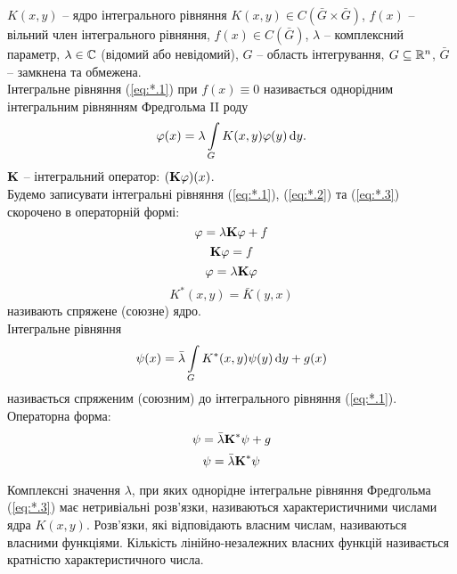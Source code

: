 $K(x, y)$ -- ядро інтегрального рівняння $K(x, y) \in C(\bar G \times \bar G)$, $f(x)$ -- вільний член інтегрального рівняння, $f(x) \in C(\bar G)$, $\lambda$ -- комплексний параметр, $\lambda \in \CC$ (відомий або невідомий), $G$ -- область інтегрування, $G \subseteq \RR^n$, $\bar G$ -- замкнена та обмежена. \\

Інтегральне рівняння (\ref{eq:*.1}) при $f(x) \equiv 0$ називається однорідним інтегральним рівнянням Фредгольма II роду
\begin{equation}
	\label{eq:*.3}
	\phi(x) = \lambda \Int_G K(x, y) \phi(y) \diff y.
\end{equation}
$\bf{K}$ -- інтегральний оператор: $(\bf{K} \phi)(x)$. \\

Будемо записувати інтегральні рівняння (\ref{eq:*.1}), (\ref{eq:*.2}) та (\ref{eq:*.3}) скорочено в операторній формі:
\begin{equation}
	\label{eq:*.1'}
	\phi = \lambda \bf{K} \phi + f
\end{equation}
\begin{equation}
	\label{eq:*.2'}
	\bf{K} \phi = f
\end{equation}
\begin{equation}
	\label{eq:*.3'}
	\phi = \lambda \bf{K} \phi
\end{equation}
\begin{equation}
	\label{eq:*.4}
	K^*(x, y) = \bar K(y, x)
\end{equation}
називають спряжене (союзне) ядро. \\

Інтегральне рівняння
\begin{equation}
	\label{eq:*.5}
	\psi(x) = \bar \lambda \Int_G K^*(x, y) \psi(y) \diff y + g(x)
\end{equation}
називається спряженим (союзним) до інтегрального рівняння (\ref{eq:*.1}). \\

Операторна форма:
\begin{equation}
	\label{eq:*.5'}
	\psi = \bar \lambda \bf{K}^* \psi + g
\end{equation}
\begin{equation}
	\label{eq:*.6}
	\psi = \bar \lambda \bf{K}^* \psi
\end{equation}

\begin{definition*}
	Комплексні значення $\lambda$, при яких однорідне інтегральне рівняння Фредгольма (\ref{eq:*.3}) має нетривіальні розв’язки, називаються характеристичними числами ядра $K(x, y)$. Розв’язки, які відповідають власним числам, називаються власними функціями. Кількість лінійно-незалежних власних функцій називається кратністю характеристичного числа.
\end{definition*}

